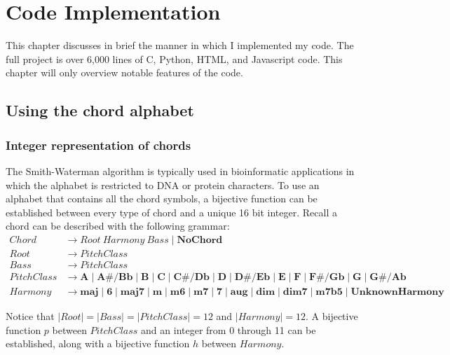 \chapter{Code Implementation}

This chapter discusses in brief the manner in which I implemented my code. The full project is over 6,000 lines of C, Python, HTML, and Javascript code. This chapter will only overview notable features of the code.

\section{Using the chord alphabet}

\subsection{Integer representation of chords}

The Smith-Waterman algorithm is typically used in bioinformatic applications in which the alphabet is restricted to DNA or protein characters. To use an alphabet that contains all the chord symbols, a bijective function can be established between every type of chord and a unique 16 bit integer. Recall a chord can be described with the following grammar:
\begin{align*}
Chord &\to Root\ Harmony \ Bass \mid \textbf{NoChord} \\
Root &\to PitchClass \\
Bass &\to PitchClass \\
PitchClass &\to \textbf{A} \mid \textbf{A#/Bb} \mid \textbf{B} \mid \textbf{C} \mid \textbf{C#/Db} \mid \textbf{D} \mid \textbf{D#/Eb} \mid \textbf{E} \mid \textbf{F} \mid \textbf{F#/Gb} \mid \textbf{G} \mid \textbf{G#/Ab} \\
Harmony &\to \textbf{maj} \mid \textbf{6} \mid \textbf{maj7} \mid \textbf{m} \mid \textbf{m6} \mid \textbf{m7} \mid \textbf{7} \mid \textbf{aug} \mid \textbf{dim} \mid \textbf{dim7} \mid \textbf{m7b5} \mid \textbf{UnknownHarmony}
\end{align*}

Notice that $|Root| = |Bass| = |PitchClass| = 12$ and $|Harmony| = 12$. A bijective function $p$ between $PitchClass$ and an integer from 0 through 11 can be established, along with a bijective function $h$ between $Harmony$.

